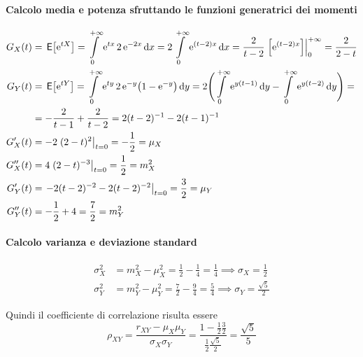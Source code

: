 \begin{esempio}
\paragraph{Calcolo media e potenza sfruttando le funzioni generatrici dei momenti}
\begin{align*}
	G_X (t) &= \E{\e{tX}} = \intd{0}{+\infty}{\e{tx} 2 \e{-2x}}{x} = 2\intd{0}{+\infty}{\e{(t-2)x}}{x} = \frac{2}{t-2} \bound{0}{+\infty}{\e{(t-2)x}} = \frac{2}{2-t} \\
	G_Y (t) &= \E{\e{tY}} = \intd{0}{+\infty}{\e{ty} 2 \e{-y} \bigl(1 - \e{-y}\bigr)}{y} = 2\Biggl( \intd{0}{+\infty}{\e{y(t-1)}}{y} - \intd{0}{+\infty}{\e{y(t-2)}}{y} \Biggr) = \\
		&= -\frac{2}{t-1} + \frac{2}{t-2} = 2(t-2)^{-1} -2(t-1)^{-1} \\
	G'_X(t) &= -2\restrict{(2-t)^2}{t=0} = -\frac{1}{2} = \mu_X \\
	G''_X(t)&= 4\restrict{(2-t)^{-3}}{t=0} = \frac{1}{2} = m^2_X \\
	G'_Y(t) &= \restrict{-2(t-2)^{-2} - 2(t-2)^{-2}}{t=0} = \frac{3}{2} = \mu_Y \\
	G''_Y(t)&= -\frac{1}{2} + 4 = \frac{7}{2} = m^2_Y
\end{align*}

\paragraph{Calcolo varianza e deviazione standard}
\begin{align*}
	\sigma^2_X &= m^2_X - \mu^2_X = \frac{1}{2} - \frac{1}{4} = \frac{1}{4} \implies \sigma_X = \frac{1}{2} \\
	\sigma^2_Y &= m^2_Y - \mu^2_Y = \frac{7}{2} - \frac{9}{4} = \frac{5}{4} \implies \sigma_Y = \frac{\sqrt{5}}{2}
\end{align*}

Quindi il coefficiente di correlazione risulta essere
\[
	\rho_{XY} = \frac{r_{XY} - \mu_X \mu_Y}{\sigma_X \sigma_Y} =
	\frac{1 - \frac{1}{2} \frac{3}{2}}{\frac{1}{2} \frac{\sqrt{5}}{2}} = \frac{\sqrt{5}}{5}
\]
\end{esempio}

